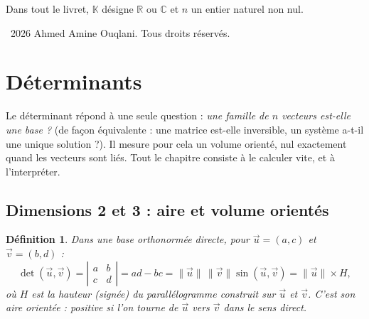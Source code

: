 \documentclass[a4paper,11pt]{article}
\numberwithin{equation}{section}
\numberwithin{figure}{section}
\numberwithin{table}{section}
\theoremstyle{enonce}
\newtheorem{definition}{Définition}[section]
\theoremstyle{exemple}
\theoremstyle{remarque}
\newcommand{\K}{\mathbb{K}}
\newcommand{\R}{\mathbb{R}}
\newcommand{\C}{\mathbb{C}}
\newcommand{\ve}[1]{\vec{#1}}
\newcommand{\dt}[1]{\left|\begin{matrix}#1\end{matrix}\right|}
\newif\ifonglets \ongletsfalse
\begin{document}
Dans tout le livret, $\K$ désigne $\R$ ou $\C$ et $n$ un entier naturel non nul.

\vfill
{\footnotesize\sffamily\color{Gris}\textcopyright~2026 Ahmed Amine Ouqlani. Tous droits réservés.\par}

\clearpage
\thispagestyle{plain}
\hypertarget{toc}{}
\renewcommand{\contentsname}{Sommaire}
\tableofcontents
\clearpage
{}
\ongletstrue
\clearpage
\section{Déterminants}

Le déterminant répond à une seule question : \emph{une famille de $n$ vecteurs est-elle une base ?} (de façon équivalente :
une matrice est-elle inversible, un système a-t-il une unique solution ?). Il mesure pour cela un volume orienté, nul
exactement quand les vecteurs sont liés. Tout le chapitre consiste à le calculer vite, et à l'interpréter.

\subsection{Dimensions 2 et 3 : aire et volume orientés}

\begin{definition}
Dans une base orthonormée directe, pour $\ve u=(a,c)$ et $\ve v=(b,d)$ :
\[\det(\ve u,\ve v)=\dt{a&b\\c&d}=ad-bc=\|\ve u\|\,\|\ve v\|\sin(\ve u,\ve v)=\|\ve u\|\times H,\]
où $H$ est la hauteur (signée) du parallélogramme construit sur $\ve u$ et $\ve v$. C'est son \emph{aire orientée} :
positive si l'on tourne de $\ve u$ vers $\ve v$ dans le sens direct.
\end{definition}
\end{document}
